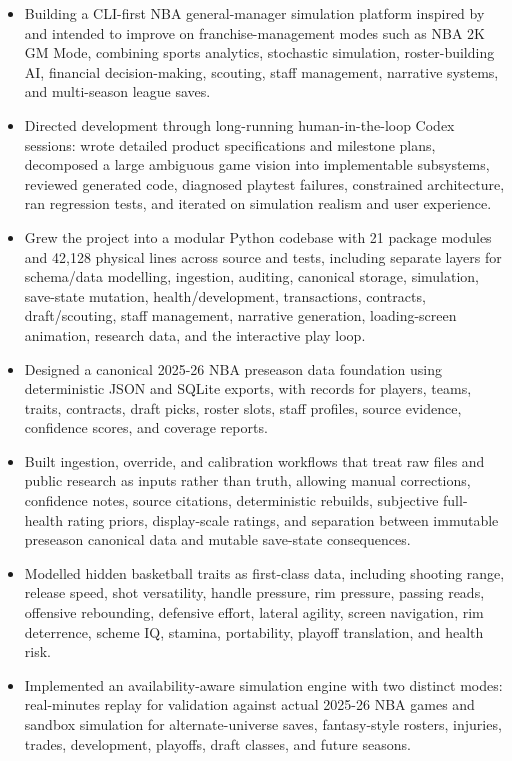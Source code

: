 \documentclass[10.5pt,letterpaper]{article}
\begin{document}
\begin{itemize}
\item Building a CLI-first NBA general-manager simulation platform inspired by and intended to improve on franchise-management modes such as NBA 2K GM Mode, combining sports analytics, stochastic simulation, roster-building AI, financial decision-making, scouting, staff management, narrative systems, and multi-season league saves.
\item Directed development through long-running human-in-the-loop Codex sessions: wrote detailed product specifications and milestone plans, decomposed a large ambiguous game vision into implementable subsystems, reviewed generated code, diagnosed playtest failures, constrained architecture, ran regression tests, and iterated on simulation realism and user experience.
\item Grew the project into a modular Python codebase with 21 package modules and 42,128 physical lines across source and tests, including separate layers for schema/data modelling, ingestion, auditing, canonical storage, simulation, save-state mutation, health/development, transactions, contracts, draft/scouting, staff management, narrative generation, loading-screen animation, research data, and the interactive play loop.
\item Designed a canonical 2025-26 NBA preseason data foundation using deterministic JSON and SQLite exports, with records for players, teams, traits, contracts, draft picks, roster slots, staff profiles, source evidence, confidence scores, and coverage reports.
\item Built ingestion, override, and calibration workflows that treat raw files and public research as inputs rather than truth, allowing manual corrections, confidence notes, source citations, deterministic rebuilds, subjective full-health rating priors, display-scale ratings, and separation between immutable preseason canonical data and mutable save-state consequences.
\item Modelled hidden basketball traits as first-class data, including shooting range, release speed, shot versatility, handle pressure, rim pressure, passing reads, offensive rebounding, defensive effort, lateral agility, screen navigation, rim deterrence, scheme IQ, stamina, portability, playoff translation, and health risk.
\item Implemented an availability-aware simulation engine with two distinct modes: real-minutes replay for validation against actual 2025-26 NBA games and sandbox simulation for alternate-universe saves, fantasy-style rosters, injuries, trades, development, playoffs, draft classes, and future seasons.

\end{itemize}
\end{document}
